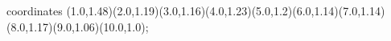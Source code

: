 					coordinates { (1.0,1.48)(2.0,1.19)(3.0,1.16)(4.0,1.23)(5.0,1.2)(6.0,1.14)(7.0,1.14)(8.0,1.17)(9.0,1.06)(10.0,1.0)};